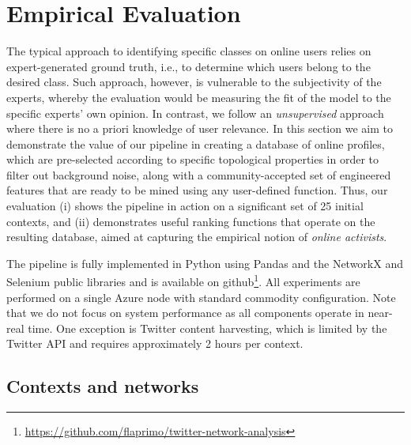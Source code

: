 \section{Empirical Evaluation} \label{sec:evaluation}

The typical approach to identifying specific classes on online users relies on expert-generated ground truth, i.e., to determine which users belong to the desired class. 
Such approach, however, is vulnerable to the subjectivity of the experts, whereby the evaluation would be measuring the fit of the model to the specific experts' own opinion. 
In contrast, we follow an \textit{unsupervised} approach where there is no a priori knowledge of user relevance.  
In this section we aim to demonstrate the value of our pipeline in creating a database of online profiles, which are pre-selected according to specific topological properties in order to filter out background noise,  along with a community-accepted set of engineered features that are ready to be mined using any user-defined function.
%
Thus, our evaluation (i) shows the pipeline in action on a significant set of 25 initial contexts, and (ii) demonstrates useful ranking functions that operate on the resulting database, aimed at capturing the empirical notion of  \textit{online activists}.

The pipeline is fully implemented in Python using Pandas and the NetworkX and Selenium public libraries and is available on github\footnote{ \url{https://github.com/flaprimo/twitter-network-analysis}}. 
All experiments are performed on a single Azure node with standard commodity configuration.
Note that we do not focus on system performance as all components operate in near-real time. One exception is  Twitter content harvesting, which is limited by the Twitter API and requires approximately 2 hours per context.

\subsection{Contexts and networks} \label{sec:contexts-selection}
 
